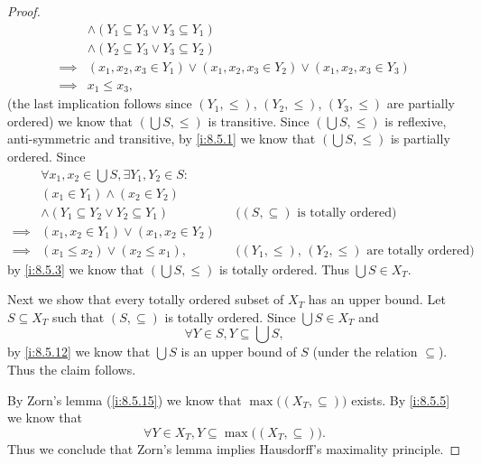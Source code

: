 \begin{proof}
\begin{align*}
             & \land (Y_1 \subseteq Y_3 \lor Y_3 \subseteq Y_1)                                                                                      \\
             & \land (Y_2 \subseteq Y_3 \lor Y_3 \subseteq Y_2)                                                                                      \\
    \implies & (x_1, x_2, x_3 \in Y_1) \lor (x_1, x_2, x_3 \in Y_2) \lor (x_1, x_2, x_3 \in Y_3)                                                     \\
    \implies & x_1 \leq x_3,
  \end{align*}
  (the last implication follows since \((Y_1, \leq)\), \((Y_2, \leq)\), \((Y_3, \leq)\) are partially ordered)
  we know that \((\bigcup S, \leq)\) is transitive.
  Since \((\bigcup S, \leq)\) is reflexive, anti-symmetric and transitive, by \cref{i:8.5.1} we know that \((\bigcup S, \leq)\) is partially ordered.
  Since
  \begin{align*}
             & \forall x_1, x_2 \in \bigcup S, \exists Y_1, Y_2 \in S :                                                                    \\
             & (x_1 \in Y_1) \land (x_2 \in Y_2)                                                                                           \\
             & \land (Y_1 \subseteq Y_2 \lor Y_2 \subseteq Y_1)         &  & \text{(\((S, \subseteq)\) is totally ordered)}                \\
    \implies & (x_1, x_2 \in Y_1) \lor (x_1, x_2 \in Y_2)                                                                                  \\
    \implies & (x_1 \leq x_2) \lor (x_2 \leq x_1),                      &  & \text{(\((Y_1, \leq)\), \((Y_2, \leq)\) are totally ordered)}
  \end{align*}
  by \cref{i:8.5.3} we know that \((\bigcup S, \leq)\) is totally ordered.
  Thus \(\bigcup S \in X_T\).

  Next we show that every totally ordered subset of \(X_T\) has an upper bound.
  Let \(S \subseteq X_T\) such that \((S, \subseteq)\) is totally ordered.
  Since \(\bigcup S \in X_T\) and
  \[
    \forall Y \in S, Y \subseteq \bigcup S,
  \]
  by \cref{i:8.5.12} we know that \(\bigcup S\) is an upper bound of \(S\) (under the relation \(\subseteq\)).
  Thus the claim follows.

  By Zorn's lemma (\cref{i:8.5.15}) we know that \(\max\big((X_T, \subseteq)\big)\) exists.
  By \cref{i:8.5.5} we know that
  \[
    \forall Y \in X_T, Y \subseteq \max\big((X_T, \subseteq)\big).
  \]
  Thus we conclude that Zorn's lemma implies Hausdorff's maximality principle.


\end{proof}

